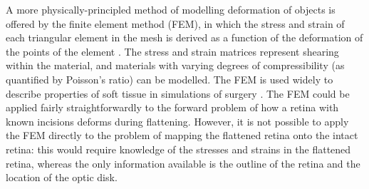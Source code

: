 \documentclass[10pt]{article}
\begin{document}
A more physically-principled method of modelling deformation of
objects is offered by the finite element method (FEM), in which the
stress and strain of each triangular element in the mesh is derived as
a function of the deformation of the points of the element
\cite{ZienTayl00fini}. The stress and strain matrices represent
shearing within the material, and materials with varying degrees of
compressibility (as quantified by Poisson's ratio) can be modelled.
The FEM is used widely to describe properties of soft tissue in
simulations of surgery \cite{CartEtal05appl}. The FEM could be applied
fairly straightforwardly to the forward problem of how a retina with
known incisions deforms during flattening. However, it is not possible
to apply the FEM directly to the problem of mapping the flattened
retina onto the intact retina: this would require knowledge of the
stresses and strains in the flattened retina, whereas the only
information available is the outline of the retina and the location of
the optic disk.







\end{document}
